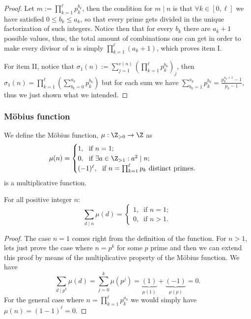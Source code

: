 \begin{proof}
    Let \(m := \prod_{k = 1}^\ell p_k^{b_k}\), then the condition for \(m \mid
    n\) is that \(\forall k \in [0, \ell]\) we have satisfied \(0 \leqslant b_k
    \leqslant a_k\), so that every prime gets divided in the unique factorization
    of such integers. Notice then that for every \(b_k\) there are \(a_k + 1\)
    possible values, thus, the total amount of combinations one can get in order
    to make every divisor of \(n\) is simply  \(\prod_{k=1}^\ell (a_k + 1)\),
    which proves item I.

    For item II, notice that \(\sigma_1(n) := \sum_{j = 1}^{v(n)} \left( \prod_{k
        = 1}^{\ell} p_k^{b_k} \right)_j\), then \(\sigma_1(n) =\prod_{k=1}^\ell \left(
    \sum_{b_k = 0}^{a_k} p_k^{b_k}\right)\) but for each sum we have \(\sum_{b_k =
        1}^{a_k} p_k^{b_k} = \frac{p_k^{a_k + 1} - 1}{p_k - 1}\), thus we just shown
    what we intended.
\end{proof}

\subsubsection{Möbius function}

\begin{definition}
    We define the Möbius function, \(\mu: \Z_{>0} \to \Z\) as
    \[
        \mu(n) =
        \begin{cases}
            1,\ \text{ if } n = 1;                              \\
            0,\ \text{ if } \exists a \in \Z_{> 1}: a^2 \mid n; \\
            (-1)^\ell,\ \text{ if } n = \prod_{k = 1}^{\ell} p_k \text{
                distinct primes. }
        \end{cases}
    \]
    is a multiplicative function.
\end{definition}

\begin{proposition}
    For all positive integer \(n\):
    \[
        \sum_{d \mid n} \mu(d) =
        \begin{cases}
            1,\ \text{ if } n = 1; \\
            0,\ \text{ if } n > 1.
        \end{cases}
    \]
\end{proposition}

\begin{proof}
    The case \(n = 1\) comes right from the definition of the function. For \(n
    > 1\), lets just prove the case where \(n = p^k\) for some  \(p\) prime and
    then we can extend this proof by means of the multiplicative property of the
    Möbius function. We have
    \[
        \sum_{d \mid p^k} \mu(d) = \sum_{j = 0}^k \mu(p^j) =
        \underbrace{(1)}_{\mu(1)} + \underbrace{(-1)}_{\mu(p)} = 0.
    \]
    For the general case where \(n = \prod_{k = 1}^\ell p_k^{a_k}\) we would
    simply have  \(\mu(n) = (1 - 1)^\ell = 0\).
\end{proof}

